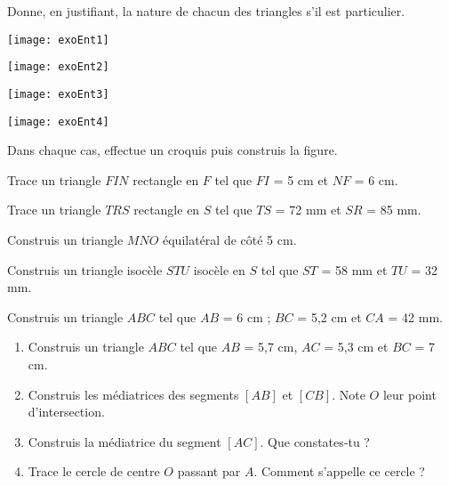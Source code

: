 

\begin{exercice}[Reconnaître]
Donne, en justifiant, la nature de chacun des triangles s'il est particulier.
\begin{colenumerate}{4}
\item \texttt{[image: exoEnt1]}
\item \texttt{[image: exoEnt2]}
\item \texttt{[image: exoEnt3]}
\item \texttt{[image: exoEnt4]}
\end{colenumerate}
\end{exercice}



\begin{exercice}
Dans chaque cas, effectue un croquis puis construis la figure.
\begin{colenumerate}{1}
\item Trace un triangle $FIN$ rectangle en $F$ tel que $FI$ = 5 cm et $NF$ = 6 cm.
\item Trace un triangle $TRS$ rectangle en $S$ tel que $TS$ = 72 mm et $SR$ = 85 mm.
\item Construis un triangle $MNO$ équilatéral de côté 5 cm.
\item Construis un triangle isocèle $STU$ isocèle en $S$ tel que $ST$ = 58 mm et $TU$ = 32 mm.
\item Construis un triangle $ABC$ tel que $AB$ = 6 cm ; $BC$ = 5,2 cm et $CA$ = 42 mm.
\end{colenumerate}
\end{exercice}



\begin{exercice}
\begin{enumerate}
\item Construis un triangle $ABC$ tel que $AB$ = 5,7 cm, $AC$ = 5,3 cm et $BC$ = 7 cm.
\item Construis les médiatrices des segments $[AB]$ et $[CB]$. Note $O$ leur point d'intersection.
\item Construis la médiatrice du segment $[AC]$. Que constates‑tu ?
\item Trace le cercle de centre $O$ passant par $A$. Comment s'appelle ce cercle ?
\end{enumerate}
\end{exercice}



